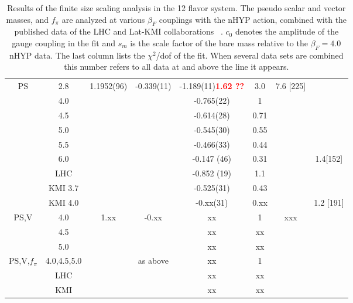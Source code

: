 \documentclass[aps,prl,twocolumn,]{revtex4}  %
\newcommand{\TODO}[1]{\textcolor{red}{{\bf #1}}}
\begin{document}
\begin{table}[htdp]
\begin{center}
\begin{tabular}{|c|c|c|c|c|c|c|c|}
PS	&	2.8	& 	1.1952(96)	&	 -0.339(11)	&	-1.189(11)\TODO{1.62 ??}	&	3.0	    &	7.6 [225] &\\
	&	4.0	& 	        	&	        	&	-0.765(22)	&	1	    &		   & \\
	&	4.5	&		        &		        &	-0.614(28)	&	0.71	&	       & \\
	&	5.0	&		        &		        &	-0.545(30)	&	0.55	&	       & \\
	&	5.5	&		        &		        &	-0.466(33)	&	0.44	&	       & \\
	&	6.0	&		        &		        &	 -0.147 (46)&	0.31	&	&      1.4[152]  \\
	&	LHC\protect\cite{Fodor:2011tu}	&	&			    &	-0.852 (19)	&	1.1 	& 	& \\
	&	KMI 3.7\protect\cite{Aoki:2012eq}	&	&			    &	-0.525(31)	&	0.43 &	 &	 \\
	&	KMI 4.0\protect\cite{Aoki:2012eq}	&	&			    &	-0.xx(31)	&	0.xx &	& 1.2 [191]	 \\
\hline
PS,V	&	4.0	& 	1.xx	&	 -0.xx 	&	xx	&	1	&	xxx	\\
	&	4.5	&		&			&	xx	&	xx	&	 \\
	&	5.0	&		&			&	xx	&	xx	&	\\	
\hline
PS,V,$f_\pi$	&	4.0,4.5,5.0	& 		&	 as above 	&	xx	&	1	&		\\
	&	LHC\protect\cite{Fodor:2011tu}	&		&			&	xx	&	xx	&	 \\
	&	KMI\protect\cite{Aoki:2012eq} 	&		&			&	xx	&	xx	&	 \\
\hline	
	
\hline
\end{tabular}

\end{center}
 \caption{Results of the finite size scaling analysis in the 12 flavor system. The pseudo scalar and  vector masses, and $f_\pi$ are analyzed at various $\beta_F$ couplings with the nHYP action, combined with the published data of the LHC and Lat-KMI collaborations ~\protect\cite{Fodor:2011tu,Aoki:2012eq}.  
 $c_0$ denotes the amplitude of the gauge coupling in the fit and $s_m$ is the scale factor of the bare mass relative to the $\beta_F=4.0$ nHYP data. The last column lists the $\chi^2$/dof of the fit. When several data sets are combined this number refers to all data at and above the line it appears.
 }


\label{table:results}
\end{table}%
\end{document}
